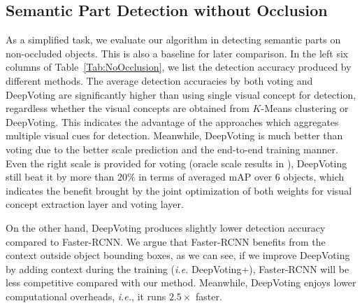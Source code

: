\documentclass[10pt,twocolumn,letterpaper]{article}
\begin{document}
  \subsection{Semantic Part Detection without Occlusion}
  \label{Experiments:NonOcclusion}

  As a simplified task, we evaluate our algorithm in detecting semantic parts on non-occluded objects. This is also a baseline for later comparison. In the left six columns of Table~\ref{Tab:NoOcclusion}, we list the detection accuracy produced by different methods. The average detection accuracies by both voting and DeepVoting are significantly higher than using single visual concept for detection, regardless whether the visual concepts are obtained from $K$-Means clustering or DeepVoting. This indicates the advantage of the approaches which aggregates multiple visual cues for detection. Meanwhile, DeepVoting is much better than voting due to the better scale prediction and the end-to-end training manner. Even the right scale is provided for voting (oracle scale results in \cite{wang2017detecting}), DeepVoting still beat it by more than $20\%$ in terms of averaged mAP over 6 objects, which indicates the benefit brought by the joint optimization of both weights for visual concept extraction layer and voting layer.

  On the other hand, DeepVoting produces slightly lower detection accuracy compared to Faster-RCNN. We argue that Faster-RCNN benefits from the context outside object bounding boxes, as we can see, if we improve DeepVoting by adding context during the training ({\em i.e.} DeepVoting+), Faster-RCNN will be less competitive compared with our method. Meanwhile, DeepVoting enjoys lower computational overheads, {\em i.e.}, it runs $2.5\times$ faster.
\end{document}
